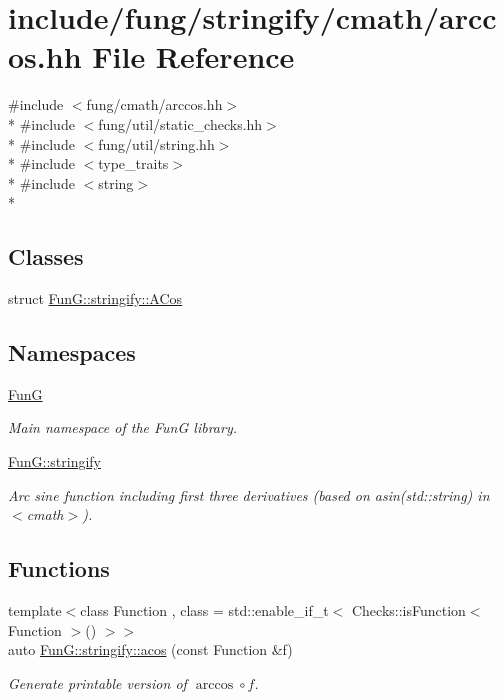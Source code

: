 \hypertarget{stringify_2cmath_2arccos_8hh}{\section{include/fung/stringify/cmath/arccos.hh File Reference}
\label{stringify_2cmath_2arccos_8hh}
}
{\ttfamily \#include $<$fung/cmath/arccos.\-hh$>$}\\*
{\ttfamily \#include $<$fung/util/static\-\_\-checks.\-hh$>$}\\*
{\ttfamily \#include $<$fung/util/string.\-hh$>$}\\*
{\ttfamily \#include $<$type\-\_\-traits$>$}\\*
{\ttfamily \#include $<$string$>$}\\*
\subsection*{Classes}
\begin{DoxyCompactItemize}
\item 
struct \hyperlink{structFunG_1_1stringify_1_1ACos}{Fun\-G\-::stringify\-::\-A\-Cos}
\end{DoxyCompactItemize}
\subsection*{Namespaces}
\begin{DoxyCompactItemize}
\item 
\hyperlink{namespaceFunG}{Fun\-G}
\begin{DoxyCompactList}\small\item\em Main namespace of the Fun\-G library. \end{DoxyCompactList}\item 
\hyperlink{namespaceFunG_1_1stringify}{Fun\-G\-::stringify}
\begin{DoxyCompactList}\small\item\em Arc sine function including first three derivatives (based on asin(std\-::string) in $<$cmath$>$). \end{DoxyCompactList}\end{DoxyCompactItemize}
\subsection*{Functions}
\begin{DoxyCompactItemize}
\item 
{\footnotesize template$<$class Function , class  = std\-::enable\-\_\-if\-\_\-t$<$ Checks\-::is\-Function$<$ Function $>$() $>$$>$ }\\auto \hyperlink{group__std_gaec458ee50fd7b49de4dc2ed1286e8286}{Fun\-G\-::stringify\-::acos} (const Function \&f)
\begin{DoxyCompactList}\small\item\em Generate printable version of $ \arccos\circ f $. \end{DoxyCompactList}\end{DoxyCompactItemize}
